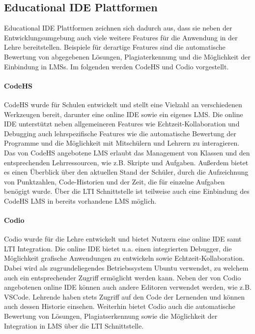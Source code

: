 \subsection{Educational IDE Plattformen}\label{section:stand-der-technik:weitere-entwicklungen:educational-ide-plattformen}

Educational IDE Plattformen zeichnen sich dadurch aus, dass sie neben der Entwicklungsumgebung auch viele weitere Features für die Anwendung in der Lehre bereitstellen. Beispiele für derartige Features sind die automatische Bewertung von abgegebenen Lösungen, Plagiaterkennung und die Möglichkeit der Einbindung in \acp{LMS}. Im folgenden werden CodeHS \cite{noauthor_codehs_nodate} und Codio \cite{noauthor_codio_nodate} vorgestellt.

\paragraph{CodeHS}
CodeHS \cite{noauthor_codehs_nodate} wurde für Schulen entwickelt und stellt eine Vielzahl an verschiedenen Werkzeugen bereit, darunter eine online IDE sowie ein eigenes \ac{LMS}. Die online IDE unterstützt neben allgemeineren Features wie Echtzeit-Kollaboration und Debugging auch lehrspezifische Features wie die automatische Bewertung der Programme und die Möglichkeit mit Mitschülern und Lehrern zu interagieren. Das von CodeHS angebotene \ac{LMS} erlaubt das Management von Klassen und den entsprechenden Lehrressourcen, wie z.B. Skripte und Aufgaben. Außerdem bietet es einen Überblick über den aktuellen Stand der Schüler, durch die Aufzeichnung von Punktzahlen, Code-Historien und der Zeit, die für einzelne Aufgaben benögigt wurde. Über die \ac{LTI} Schnittstelle ist teilweise auch eine Einbindung des CodeHS \ac{LMS} in bereits vorhandene \ac{LMS} möglich.

\paragraph{Codio}
Codio \cite{noauthor_codio_nodate} wurde für die Lehre entwickelt und bietet Nutzern eine online IDE samt \ac{LTI} Integration. Die online IDE bietet u.a. einen integrierten Debugger, die Möglichkeit grafische Anwendungen zu entwickeln sowie Echtzeit-Kollaboration. Dabei wird als zugrundeliegendes Betriebssystem Ubuntu verwendet, zu welchem auch ein entsprechender Zugriff ermöglicht werden kann. Neben der von Codio angebotenen online IDE können auch andere Editoren verwendet werden, wie z.B. \ac{VSCode}. Lehrende haben stets Zugriff auf den Code der Lernenden und können auch dessen Historie einsehen. Weiterhin bietet Codio auch die automatische Bewertung von Lösungen, Plagiatserkennung sowie die Möglichkeit der Integration in \ac{LMS} über die \ac{LTI} Schnittstelle.
